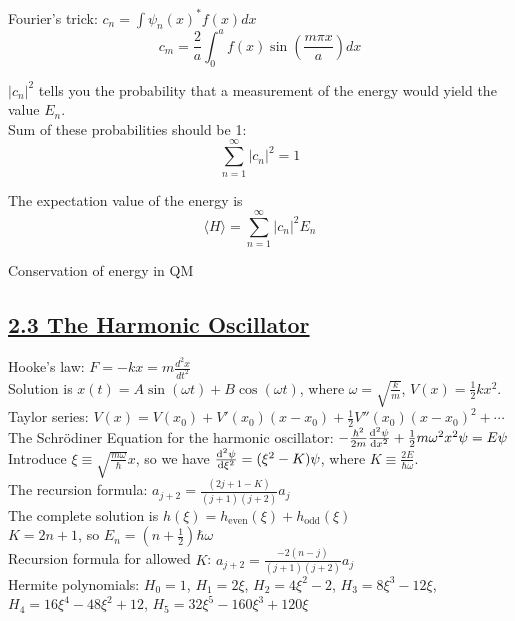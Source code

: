 Fourier's trick: $c_n = \int \psi_n(x)^* f(x) dx$ \\
$$c_m = \frac{2}{a} \int_0^a f(x) \sin(\frac{m \pi x}{a}) dx$$

$|c_n|^2$ tells you the probability that a measurement of the energy would yield the value $E_n$. \\

Sum of these probabilities should be 1: 
    $$\sum_{n=1}^{\infty} |c_n|^2 = 1$$

The expectation value of the energy is
    $$\langle H \rangle = \sum_{n=1}^{\infty} |c_n|^2 E_n$$

Conservation of energy in QM

\subsection{\underline{2.3 The Harmonic Oscillator}}
Hooke's law: $F = -kx = m \frac{d^2 x}{d t^2}$ \\
Solution is $x(t) = A \sin(\omega t) + B \cos(\omega t)$, where $\omega = \sqrt{\frac{k}{m}}$, $V(x) = \frac{1}{2} k x^2$. \\

Taylor series: $V(x) = V(x_0) + V'(x_0) (x - x_0) + \frac{1}{2} V''(x_0)(x- x_0)^2 + \cdots$ \\

The Schr\"{o}diner Equation for the harmonic oscillator: $-\frac{\hbar^2}{2m} \dv[2]{\psi}{x} + \frac{1}{2} m \omega^2 x^2 \psi = E \psi$ \\
Introduce $\xi \equiv \sqrt{\frac{m \omega}{\hbar}} x$, so we have $\dv[2]{\psi}{\xi} = (\xi^2 - K) \psi$, where $K \equiv \frac{2E}{\hbar \omega}$. \\

The recursion formula: $a_{j+2} = \frac{(2j + 1 - K)}{(j + 1)(j + 2)} a_j$ \\
The complete solution is $h(\xi) = h_{\text{even}}(\xi) + h_{\text{odd}}(\xi)$ \\

$K = 2n + 1$, so $E_n = (n + \frac{1}{2}) \hbar \omega$ \\

Recursion formula for allowed $K$: $a_{j+2} = \frac{-2(n - j)}{(j+1)(j+2)} a_j$ \\

Hermite polynomials: $H_0 = 1$, $H_1 = 2 \xi$, $H_2 = 4 \xi^2 - 2$, $H_3 = 8 \xi^3 - 12 \xi$, $H_4 = 16 \xi^4 - 48 \xi^2 + 12$, $H_5 = 32 \xi^5 - 160 \xi^3 + 120 \xi$ \\

